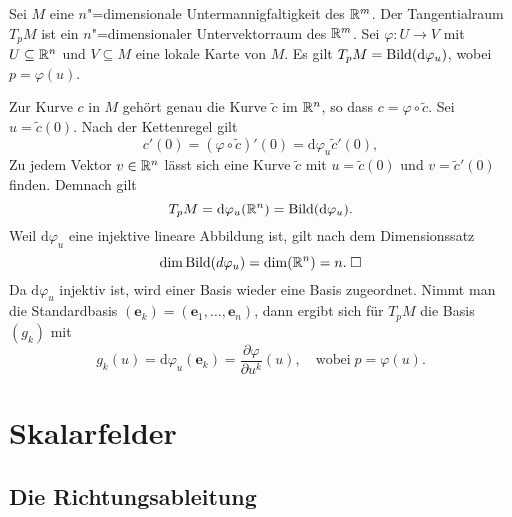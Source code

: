 \begin{theorem}
Sei $M$ eine $n$"=dimensionale Untermannigfaltigkeit des $\mathbb R^m$.
Der Tangentialraum $T_p M$ ist ein $n$"=dimensionaler Untervektorraum
des $\mathbb R^m$. Sei $\varphi\colon U\to V$ mit $U\subseteq\mathbb R^n$ und
$V\subseteq M$ eine lokale Karte von $M$.  Es gilt
$T_p M = \operatorname{Bild}(\mathrm d\varphi_u)$, wobei $p=\varphi(u)$. 
\end{theorem}

\noindent{}
Zur Kurve $c$ in $M$ gehört genau die Kurve $\tilde c$ im $\mathbb R^n$, so
dass $c=\varphi\circ\tilde c$. Sei $u=\tilde c(0)$. Nach der
Kettenregel gilt%
\begin{equation}
c'(0) = (\varphi\circ\tilde c)'(0) = \mathrm d\varphi_u\tilde c'(0),
\end{equation}
Zu jedem Vektor $v\in\mathbb R^n$ lässt sich eine Kurve $\tilde c$
mit $u=\tilde c(0)$ und $v=\tilde c'(0)$ finden. Demnach gilt
\begin{equation}
T_p M = \mathrm d\varphi_u(\mathbb R^n) = \operatorname{Bild}(\mathrm d\varphi_u).
\end{equation}
Weil $\mathrm d\varphi_u$ eine injektive lineare Abbildung ist,
gilt nach dem Dimensionssatz%
\begin{equation}
\dim\operatorname{Bild}(d\varphi_u) = \dim(\mathbb R^n) = n.\;\Box
\end{equation}
Da $\mathrm d\varphi_u$ injektiv ist, wird einer Basis wieder eine
Basis zugeordnet. Nimmt man die Standardbasis
$(\mathbf e_k)=(\mathbf e_1,\ldots,\mathbf e_n)$, dann ergibt
sich für $T_p M$ die Basis $(g_k)$ mit
\begin{equation}
g_k(u) = \mathrm d\varphi_u(\mathbf e_k)
= \frac{\partial\varphi}{\partial u^k}(u),\quad\text{wobei}\; p=\varphi(u).
\end{equation}


\section{Skalarfelder}

\subsection{Die Richtungsableitung}

